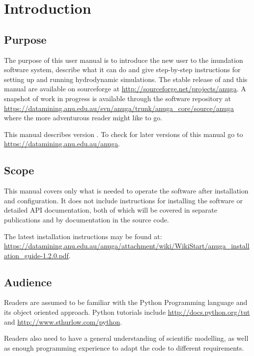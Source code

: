 \documentclass{manual}
\begin{document}

\chapter{Introduction}


\section{Purpose}

The purpose of this user manual is to introduce the new user to the
inundation software system, describe what it can do and give step-by-step
instructions for setting up and running hydrodynamic simulations.
The stable release of \anuga and this manual are available on sourceforge at
\url{http://sourceforge.net/projects/anuga}. A snapshot of work in progress is
available through the \anuga software repository at
\url{https://datamining.anu.edu.au/svn/anuga/trunk/anuga_core/source/anuga}
where the more adventurous reader might like to go.

This manual describes \anuga version \version. To check for later versions of this manual
go to \url{https://datamining.anu.edu.au/anuga}.

\section{Scope}

This manual covers only what is needed to operate the software after
installation and configuration. It does not include instructions
for installing the software or detailed API documentation, both of
which will be covered in separate publications and by documentation
in the source code.

The latest installation instructions may be found at:
\url{https://datamining.anu.edu.au/anuga/attachment/wiki/WikiStart/anuga_installation_guide-1.2.0.pdf}.

\section{Audience}

Readers are assumed to be familiar with the Python Programming language and
its object oriented approach.
Python tutorials include
\url{http://docs.python.org/tut} and \url{http://www.sthurlow.com/python}.

Readers also need to have a general understanding of scientific modelling,
as well as enough programming experience to adapt the code to different
requirements.
\end{document}
